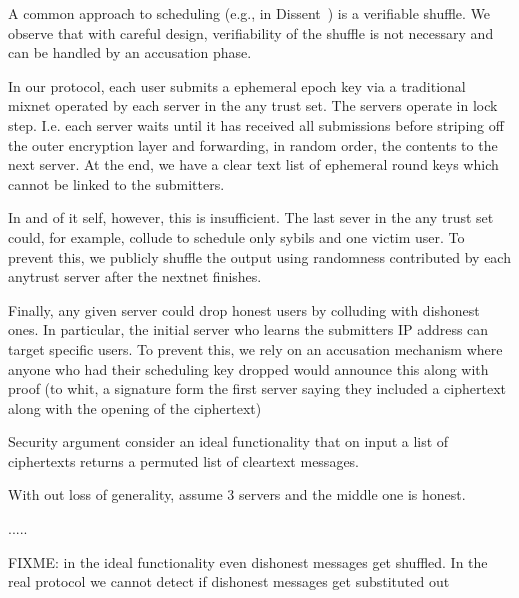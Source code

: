 A common approach to scheduling (e.g., in Dissent~\cite{CCS:CorFor10}) is a verifiable shuffle.  We observe that with careful design, verifiability of the shuffle is not necessary and can be handled by an accusation phase.

In our protocol, each user submits a ephemeral epoch key via a traditional mixnet operated by each server in the any trust set. The servers operate in lock step. I.e. each server waits until it has received all submissions before striping off the outer encryption layer and forwarding, in random order, the contents to the next server. At the end, we have a clear text list of ephemeral round keys which cannot be linked to the submitters.

In and of it self, however, this is insufficient.  The last sever in the any trust set could, for example,  collude to schedule only sybils and one victim user. To prevent this, we publicly shuffle the  output using randomness contributed by each anytrust server after the nextnet finishes.

Finally, any given server could drop honest users  by colluding with dishonest ones. In particular, the initial server who learns the submitters IP address can target specific users. To prevent this, we rely on an accusation mechanism where anyone who had their scheduling key dropped would announce this along with proof (to whit, a signature form the first server saying they included a ciphertext along with the opening of the ciphertext)


Security argument consider an ideal functionality that on input a list of ciphertexts returns a permuted list of cleartext messages.

With out loss of generality, assume  3 servers and the middle one is honest. 

.....

FIXME: in the ideal functionality even dishonest messages get shuffled. In the real protocol we cannot detect if dishonest messages get substituted out 





